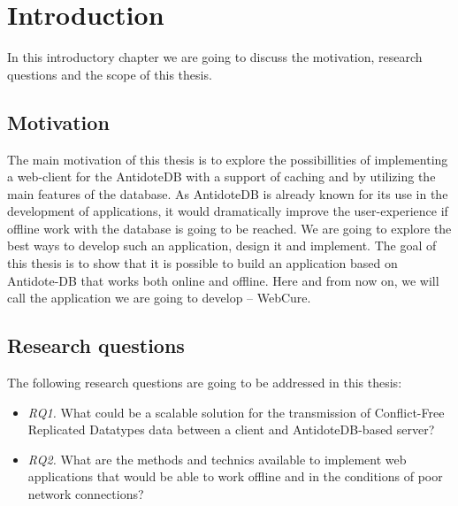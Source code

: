 \chapter{Introduction}
\label{Introduction}

In this introductory chapter we are going to discuss the motivation, research questions and the scope of this thesis.

\section{Motivation}
\label{Introduction-Motivation}

The main motivation of this thesis is to explore the possibillities of implementing a web-client for the AntidoteDB with a support of caching and by utilizing the main features of the database. As AntidoteDB is already known for its use in the development of applications, it would dramatically improve the user-experience if offline work with the database is going to be reached. We are going to explore the best ways to develop such an application, design it and implement. The goal of this thesis is to show that it is possible to build an application based on Antidote-DB that works both online and offline. Here and from now on, we will call the application we are going to develop -- WebCure.


\section{Research questions}
\label{Introduction-Research}

The following research questions are going to be addressed in this thesis:

\begin{itemize}
    \item \textit{RQ1.} What could be a scalable solution for the transmission of Conflict-Free Replicated Datatypes data between a client and AntidoteDB-based server?
    \item \textit{RQ2.} What are the methods and technics available to implement web applications that would be able to work offline and
    in the conditions of poor network connections?
  \end{itemize}

